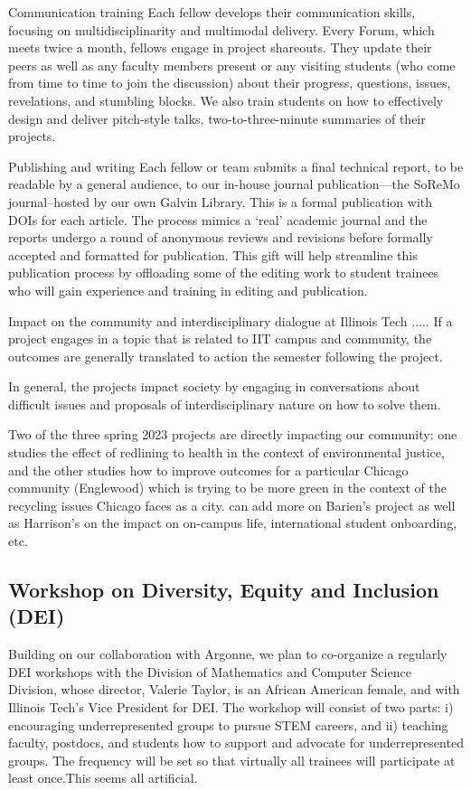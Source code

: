 \documentclass[11pt]{NSFamsart}
\begin{document}
Communication training
Each fellow develops their communication skills, focusing on multidisciplinarity and multimodal delivery. Every Forum, which meets twice a month, fellows engage in project shareouts. They update their peers as well as any faculty members present or any visiting students (who come from time to time to join the discussion) about their progress, questions, issues, revelations, and stumbling blocks. We also train students on how to effectively design and deliver pitch-style talks, two-to-three-minute summaries of their projects. 

Publishing and writing
Each fellow or team submits a final technical report, to be readable by a general audience, to our in-house journal publication—the SoReMo journal–hosted by our own Galvin Library. This is a formal publication with DOIs for each article. The process mimics a ‘real’ academic journal and the reports undergo a round of anonymous reviews and revisions before formally accepted and formatted for publication. This gift will help streamline this publication process by offloading some of the editing work to student trainees who will gain experience and training in editing and publication.

Impact on the community and interdisciplinary dialogue at Illinois Tech 
..... If a project engages in a topic that is related to IIT campus and community, the outcomes are generally translated to action the semester following the project. 

In general, the projects impact society by engaging in conversations about difficult issues and proposals of interdisciplinary nature on how to solve them. 

Two of the three spring 2023 projects are directly impacting our community: one studies the effect of redlining to health in the context of environmental justice, and the other studies how to improve outcomes for a particular Chicago community (Englewood) which is trying to be more green in the context of the recycling issues Chicago faces as a city.  {\color{magenta}can add more on Barien's project as well as Harrison's on the impact on on-campus life, international student onboarding, etc.} 


\subsection*{Workshop on Diversity, Equity and Inclusion (DEI)}
Building on our collaboration with Argonne, we plan to co-organize a regularly DEI workshops with the Division of Mathematics and Computer Science Division, whose director, Valerie Taylor, is an African American female, and with Illinois Tech's  Vice President for DEI.  The workshop will consist of two parts: i) encouraging underrepresented groups to pursue STEM careers, and ii) teaching faculty, postdocs, and students how to support and advocate for underrepresented groups.  The frequency will be set so that virtually all trainees will participate at least once.{\color{magenta}This seems all artificial.} 
\end{document}
